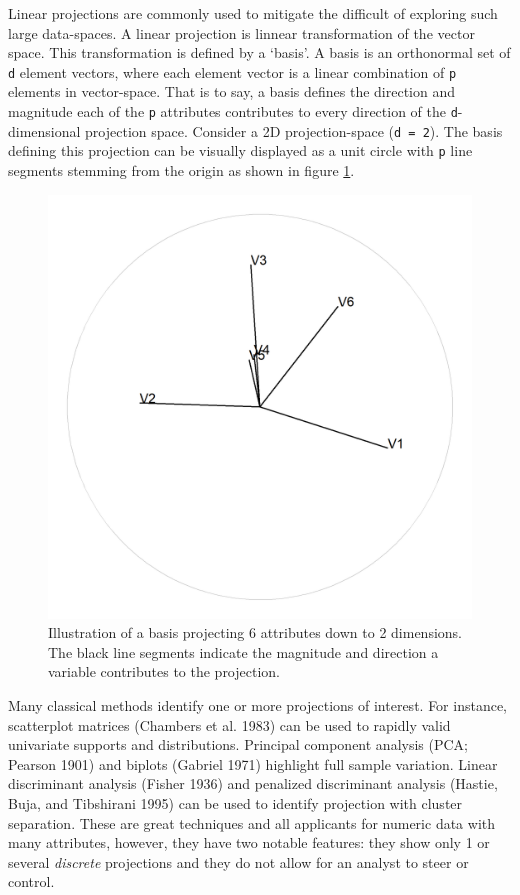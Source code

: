 \documentclass[
  11,
]{article}
\begin{document}
Linear projections are commonly used to mitigate the difficult of exploring such large data-spaces. A linear projection is linnear transformation of the vector space. This transformation is defined by a `basis'. A basis is an orthonormal set of \texttt{d} element vectors, where each element vector is a linear combination of \texttt{p} elements in vector-space. That is to say, a basis defines the direction and magnitude each of the \texttt{p} attributes contributes to every direction of the \texttt{d}-dimensional projection space. Consider a 2D projection-space (\texttt{d\ =\ 2}). The basis defining this projection can be visually displayed as a unit circle with \texttt{p} line segments stemming from the origin as shown in figure \ref{fig:basis}.

\begin{figure}[h]

{\centering \includegraphics[width=0.6\linewidth,]{./figures/basis} 

}

\caption{Illustration of a basis projecting 6 attributes down to 2 dimensions. The black line segments indicate the magnitude and direction a variable contributes to the projection.}\label{fig:basis}
\end{figure}

Many classical methods identify one or more projections of interest. For instance, scatterplot matrices (Chambers et al. 1983) can be used to rapidly valid univariate supports and distributions. Principal component analysis (PCA; Pearson 1901) and biplots (Gabriel 1971) highlight full sample variation. Linear discriminant analysis (Fisher 1936) and penalized discriminant analysis (Hastie, Buja, and Tibshirani 1995) can be used to identify projection with cluster separation. These are great techniques and all applicants for numeric data with many attributes, however, they have two notable features: they show only 1 or several \emph{discrete} projections and they do not allow for an analyst to steer or control.
\end{document}
